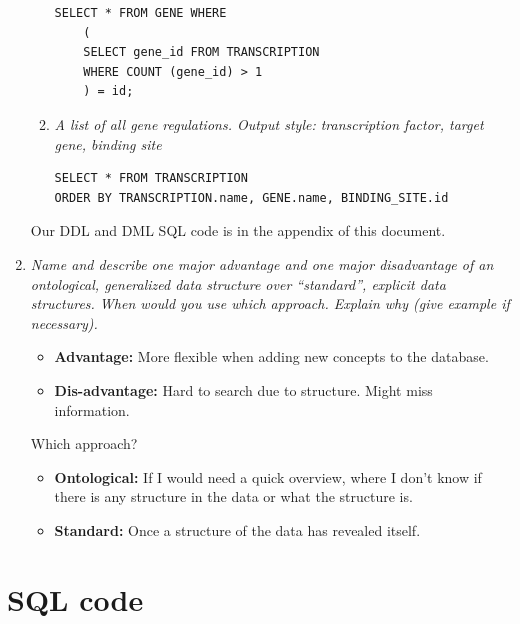 \documentclass[a4paper,10pt,titlepage]{article}
\begin{document}
\begin{enumerate}
\begin{enumerate}
\begin{lstlisting}
SELECT * FROM GENE WHERE 
	(
	SELECT gene_id FROM TRANSCRIPTION 
	WHERE COUNT (gene_id) > 1
	) = id;
\end{lstlisting}

\item
\textit{A list of all gene regulations. Output style: transcription factor, target gene, binding site}
\begin{lstlisting}
SELECT * FROM TRANSCRIPTION 
ORDER BY TRANSCRIPTION.name, GENE.name, BINDING_SITE.id
\end{lstlisting}
\end{enumerate}

Our DDL and DML SQL code is in the appendix of this document.

\item
\textit{Name and describe one major advantage and one major disadvantage of an ontological, generalized data structure over “standard”, explicit data structures. When would you use which approach. Explain why (give example if necessary).}\\

\begin{itemize}
\item
\textbf{Advantage:} More flexible when adding new concepts to the database.

\item
\textbf{Dis-advantage:} Hard to search due to structure. Might miss information.
\end{itemize}
Which approach?
\begin{itemize}
\item
\textbf{Ontological:} If I would need a quick overview, where I don't know if there is any structure in the data or what the structure is.
\item
\textbf{Standard:} Once a structure of the data has revealed itself.
\end{itemize}
\end{enumerate}

\appendix
\section{SQL code}

\lstset{language=SQL}

\end{document}
